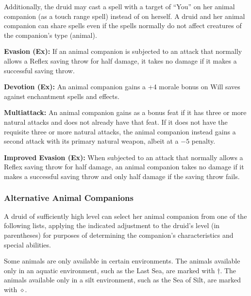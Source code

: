Additionally, the druid may cast a spell with a target of ``You'' on her animal companion (as a touch range spell) instead of on herself. A druid and her animal companion can share spells even if the spells normally do not affect creatures of the companion's type (animal).

\textbf{Evasion (Ex):} If an animal companion is subjected to an attack that normally allows a Reflex saving throw for half damage, it takes no damage if it makes a successful saving throw.

\textbf{Devotion (Ex):} An animal companion gains a +4 morale bonus on Will saves against enchantment spells and effects.

\textbf{Multiattack:} An animal companion gains  as a bonus feat if it has three or more natural attacks and does not already have that feat. If it does not have the requisite three or more natural attacks, the animal companion instead gains a second attack with its primary natural weapon, albeit at a $-5$ penalty.

\textbf{Improved Evasion (Ex):} When subjected to an attack that normally allows a Reflex saving throw for half damage, an animal companion takes no damage if it makes a successful saving throw and only half damage if the saving throw fails.

\subsubsection{Alternative Animal Companions}
A druid of sufficiently high level can select her animal companion from one of the following lists, applying the indicated adjustment to the druid's level (in parentheses) for purposes of determining the companion's characteristics and special abilities.

Some animals are only available in certain environments. The animals available only in an aquatic environment, such as the Last Sea, are marked with $\dagger$. The animals available only in a silt environment, such as the Sea of Silt, are marked with $\diamond$.



